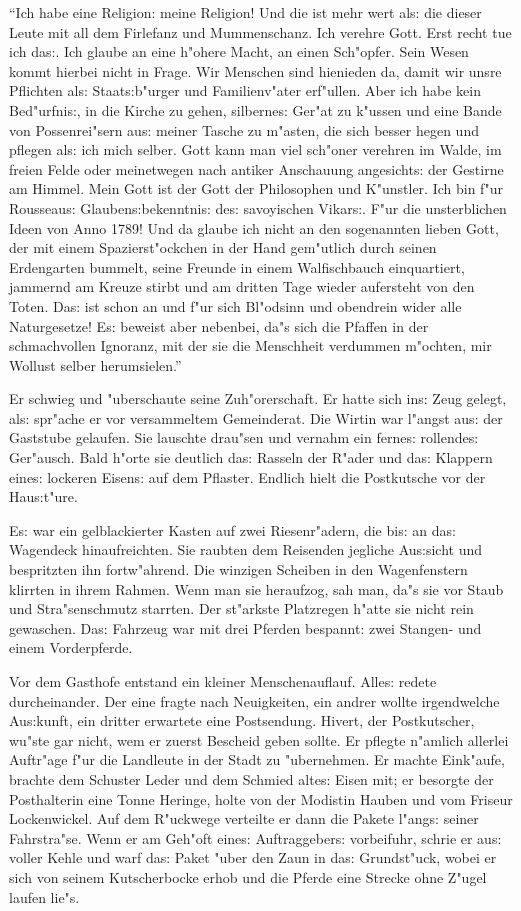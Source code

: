 \documentclass[oneside,12pt]{book}
\newcommand{\s}{s:}%
\begin{document}
"`Ich habe eine Religion: meine Religion! Und die ist mehr wert
al{\s} die dieser Leute mit all dem Firlefanz und Mummenschanz.
Ich verehre Gott. Erst recht tue ich da{\s}. Ich glaube an eine
h"ohere Macht, an einen Sch"opfer. Sein Wesen kommt hierbei nicht
in Frage. Wir Menschen sind hienieden da, damit wir unsre
Pflichten al{\s} Staat{\s}b"urger und Familienv"ater erf"ullen.
Aber ich habe kein Bed"urfni{\s}, in die Kirche zu gehen,
silberne{\s} Ger"at zu k"ussen und eine Bande von Possenrei"sern
au{\s} meiner Tasche zu m"asten, die sich besser hegen und pflegen
al{\s} ich mich selber. Gott kann man viel sch"oner verehren im
Walde, im freien Felde oder meinetwegen nach antiker Anschauung
angesicht{\s} der Gestirne am Himmel. Mein Gott ist der Gott der
Philosophen und K"unstler. Ich bin f"ur Rousseau{\s}
Glauben{\s}bekenntni{\s} de{\s} savoyischen Vikar{\s}. F"ur die
unsterblichen Ideen von Anno 1789! Und da glaube ich nicht an den
sogenannten lieben Gott, der mit einem Spazierst"ockchen in der
Hand gem"utlich durch seinen Erdengarten bummelt, seine Freunde in
einem Walfischbauch einquartiert, jammernd am Kreuze stirbt und am
dritten Tage wieder aufersteht von den Toten. Da{\s} ist schon an
und f"ur sich Bl"odsinn und obendrein wider alle Naturgesetze!
E{\s} beweist aber nebenbei, da"s sich die Pfaffen in der
schmachvollen Ignoranz, mit der sie die Menschheit verdummen
m"ochten, mir Wollust selber herumsielen."'

Er schwieg und "uberschaute seine Zuh"orerschaft. Er hatte sich
in{\s} Zeug gelegt, al{\s} spr"ache er vor versammeltem
Gemeinderat. Die Wirtin war l"angst au{\s} der Gaststube gelaufen.
Sie lauschte drau"sen und vernahm ein ferne{\s} rollende{\s}
Ger"ausch. Bald h"orte sie deutlich da{\s} Rasseln der R"ader und
da{\s} Klappern eine{\s} lockeren Eisen{\s} auf dem Pflaster.
Endlich hielt die Postkutsche vor der Hau{\s}t"ure.

E{\s} war ein gelblackierter Kasten auf zwei Riesenr"adern, die
bi{\s} an da{\s} Wagendeck hinaufreichten. Sie raubten dem
Reisenden jegliche Au{\s}sicht und bespritzten ihn fortw"ahrend.
Die winzigen Scheiben in den Wagenfenstern klirrten in ihrem
Rahmen. Wenn man sie heraufzog, sah man, da"s sie vor Staub und
Stra"senschmutz starrten. Der st"arkste Platzregen h"atte sie
nicht rein gewaschen. Da{\s} Fahrzeug war mit drei Pferden
bespannt: zwei Stangen- und einem Vorderpferde.

Vor dem Gasthofe entstand ein kleiner Menschenauflauf. Alle{\s}
redete durcheinander. Der eine fragte nach Neuigkeiten, ein andrer
wollte irgendwelche Au{\s}kunft, ein dritter erwartete eine
Postsendung. Hivert, der Postkutscher, wu"ste gar nicht, wem er
zuerst Bescheid geben sollte. Er pflegte n"amlich allerlei
Auftr"age f"ur die Landleute in der Stadt zu "ubernehmen. Er
machte Eink"aufe, brachte dem Schuster Leder und dem Schmied
alte{\s} Eisen mit; er besorgte der Posthalterin eine Tonne
Heringe, holte von der Modistin Hauben und vom Friseur
Lockenwickel. Auf dem R"uckwege verteilte er dann die Pakete
l"ang{\s} seiner Fahrstra"se. Wenn er am Geh"oft eine{\s}
Auftraggeber{\s} vorbeifuhr, schrie er au{\s} voller Kehle und
warf da{\s} Paket "uber den Zaun in da{\s} Grundst"uck, wobei er
sich von seinem Kutscherbocke erhob und die Pferde eine Strecke
ohne Z"ugel laufen lie"s.
\end{document}
